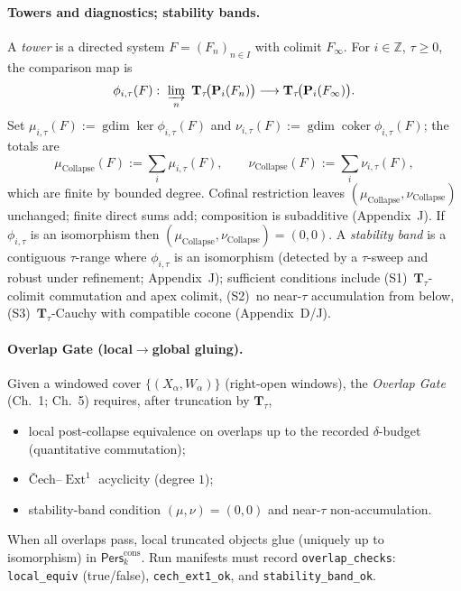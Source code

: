 \documentclass[11pt]{article}
\numberwithin{equation}{section}
\theoremstyle{plain}
\theoremstyle{definition}
\theoremstyle{remark}
\DeclareMathOperator{\Ext}{Ext}
\DeclareMathOperator{\gdim}{gdim}
\DeclareRobustCommand{\hyp}{\nobreakdash-}
\newcommand{\Pers}{\mathsf{Pers}}
\theoremstyle{plain}
\theoremstyle{definition}
\numberwithin{equation}{section}
\theoremstyle{definition}
\DeclareRobustCommand{\Perskft}{\Pers^{\mathrm{cons}}_{k}}
\DeclareRobustCommand{\muc}{\mu_{\mathrm{Collapse}}}
\DeclareRobustCommand{\nuc}{\nu_{\mathrm{Collapse}}}
\numberwithin{equation}{section}
\theoremstyle{plain}
\theoremstyle{definition}
\theoremstyle{remark}
\providecommand{\muc}{\mu_{\mathrm{Collapse}}}
\providecommand{\nuc}{\nu_{\mathrm{Collapse}}}
\begin{document}
\paragraph{Towers and diagnostics; stability bands.}
A \emph{tower} is a directed system \(F=(F_n)_{n\in I}\) with colimit \(F_\infty\).
For \(i\in\mathbb{Z}\), \(\tau\ge 0\), the comparison map is
\[
\phi_{i,\tau}(F):\ \varinjlim_{n}\ \mathbf{T}_\tau\!\big(\mathbf{P}_i(F_n)\big)\longrightarrow \mathbf{T}_\tau\!\big(\mathbf{P}_i(F_\infty)\big).
\]
Set \(\mu_{i,\tau}(F):=\gdim\ker\phi_{i,\tau}(F)\) and \(\nu_{i,\tau}(F):=\gdim\operatorname{coker}\phi_{i,\tau}(F)\); the totals are
\[
\muc(F):=\sum_{i}\mu_{i,\tau}(F),\qquad \nuc(F):=\sum_{i}\nu_{i,\tau}(F),
\]
which are finite by bounded degree.
Cofinal restriction leaves \((\muc,\nuc)\) unchanged; finite direct sums add; composition is subadditive (Appendix~J).
If \(\phi_{i,\tau}\) is an isomorphism then \((\muc,\nuc)=(0,0)\).
A \emph{stability band} is a contiguous \(\tau\)\hyp range where \(\phi_{i,\tau}\) is an isomorphism (detected by a \(\tau\)\hyp sweep and robust under refinement; Appendix~J); sufficient conditions include (S1)~\(\mathbf{T}_\tau\)\hyp colimit commutation and apex colimit, (S2)~no near\hyp \(\tau\) accumulation from below, (S3)~\(\mathbf{T}_\tau\)\hyp Cauchy with compatible cocone (Appendix~D/J).

\paragraph{Overlap Gate (local\texorpdfstring{$\to$}{->}global gluing).}
Given a windowed cover \(\{(X_\alpha,W_\alpha)\}\) (right\hyp open windows), the \emph{Overlap Gate} (Ch.~1; Ch.~5) requires, after truncation by \(\mathbf{T}_\tau\),
\begin{itemize}
  \item local post\hyp collapse equivalence on overlaps up to the recorded \(\delta\)\hyp budget (quantitative commutation);
  \item Čech–\(\Ext^1\) acyclicity (degree \(1\));
  \item stability\hyp band condition \((\mu,\nu)=(0,0)\) and near\hyp \(\tau\) non\hyp accumulation.
\end{itemize}
When all overlaps pass, local truncated objects glue (uniquely up to isomorphism) in \(\Perskft\).
Run manifests must record \texttt{overlap\_checks}: \texttt{local\_equiv} (true/false), \texttt{cech\_ext1\_ok}, and \texttt{stability\_band\_ok}.
\end{document}
